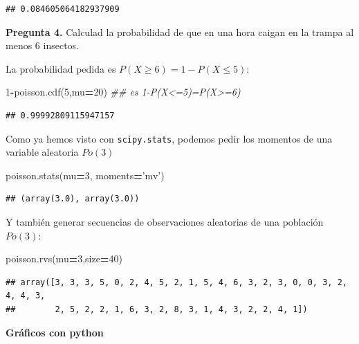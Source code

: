 \documentclass[]{book}
\newenvironment{Shaded}{\begin{snugshade}}{\end{snugshade}}
\newcommand{\CommentTok}[1]{\textcolor[rgb]{0.56,0.35,0.01}{\textit{#1}}}
\newcommand{\DecValTok}[1]{\textcolor[rgb]{0.00,0.00,0.81}{#1}}
\newcommand{\NormalTok}[1]{#1}
\newcommand{\OperatorTok}[1]{\textcolor[rgb]{0.81,0.36,0.00}{\textbf{#1}}}
\newcommand{\StringTok}[1]{\textcolor[rgb]{0.31,0.60,0.02}{#1}}
\begin{document}
\begin{verbatim}
## 0.084605064182937909
\end{verbatim}

\textbf{Pregunta 4.} Calculad la probabilidad de que en una hora caigan en la trampa al menos 6 insectos.

La probabilidad pedida es \(P(X\geq 6)=1-P(X\leq 5)\):

\begin{Shaded}
\begin{Highlighting}[]
\DecValTok{1}\OperatorTok{-}\NormalTok{poisson.cdf(}\DecValTok{5}\NormalTok{,mu}\OperatorTok{=}\DecValTok{20}\NormalTok{) }
\CommentTok{## es 1-P(X<=5)=P(X>=6)}
\end{Highlighting}
\end{Shaded}

\begin{verbatim}
## 0.99992809115947157
\end{verbatim}

Como ya hemos visto con \texttt{scipy.stats}, podemos pedir los momentos de una variable aleatoria
\(Po(3)\)

\begin{Shaded}
\begin{Highlighting}[]
\NormalTok{poisson.stats(mu}\OperatorTok{=}\DecValTok{3}\NormalTok{, moments}\OperatorTok{=}\StringTok{'mv'}\NormalTok{)}
\end{Highlighting}
\end{Shaded}

\begin{verbatim}
## (array(3.0), array(3.0))
\end{verbatim}

Y también generar secuencias de observaciones aleatorias de una población \(Po(3)\):

\begin{Shaded}
\begin{Highlighting}[]
\NormalTok{poisson.rvs(mu}\OperatorTok{=}\DecValTok{3}\NormalTok{,size}\OperatorTok{=}\DecValTok{40}\NormalTok{)}
\end{Highlighting}
\end{Shaded}

\begin{verbatim}
## array([3, 3, 3, 5, 0, 2, 4, 5, 2, 1, 5, 4, 6, 3, 2, 3, 0, 0, 3, 2, 4, 4, 3,
##        2, 5, 2, 2, 1, 6, 3, 2, 8, 3, 1, 4, 3, 2, 2, 4, 1])
\end{verbatim}

\textbf{Gráficos con python}
\end{document}
